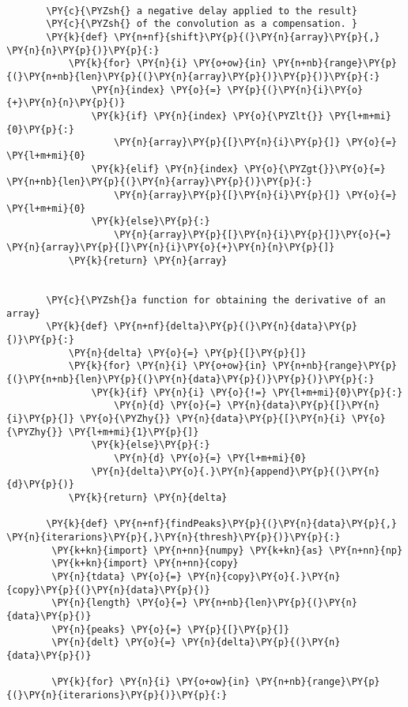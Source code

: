\begin{Verbatim}[commandchars=\\\{\}]
       
       \PY{c}{\PYZsh{} a negative delay applied to the result}
       \PY{c}{\PYZsh{} of the convolution as a compensation. }
       \PY{k}{def} \PY{n+nf}{shift}\PY{p}{(}\PY{n}{array}\PY{p}{,} \PY{n}{n}\PY{p}{)}\PY{p}{:}
           \PY{k}{for} \PY{n}{i} \PY{o+ow}{in} \PY{n+nb}{range}\PY{p}{(}\PY{n+nb}{len}\PY{p}{(}\PY{n}{array}\PY{p}{)}\PY{p}{)}\PY{p}{:}
               \PY{n}{index} \PY{o}{=} \PY{p}{(}\PY{n}{i}\PY{o}{+}\PY{n}{n}\PY{p}{)}
               \PY{k}{if} \PY{n}{index} \PY{o}{\PYZlt{}} \PY{l+m+mi}{0}\PY{p}{:}
                   \PY{n}{array}\PY{p}{[}\PY{n}{i}\PY{p}{]} \PY{o}{=} \PY{l+m+mi}{0}
               \PY{k}{elif} \PY{n}{index} \PY{o}{\PYZgt{}}\PY{o}{=} \PY{n+nb}{len}\PY{p}{(}\PY{n}{array}\PY{p}{)}\PY{p}{:}
                   \PY{n}{array}\PY{p}{[}\PY{n}{i}\PY{p}{]} \PY{o}{=} \PY{l+m+mi}{0}
               \PY{k}{else}\PY{p}{:}
                   \PY{n}{array}\PY{p}{[}\PY{n}{i}\PY{p}{]}\PY{o}{=} \PY{n}{array}\PY{p}{[}\PY{n}{i}\PY{o}{+}\PY{n}{n}\PY{p}{]}
           \PY{k}{return} \PY{n}{array}
       
       
       \PY{c}{\PYZsh{}a function for obtaining the derivative of an array}
       \PY{k}{def} \PY{n+nf}{delta}\PY{p}{(}\PY{n}{data}\PY{p}{)}\PY{p}{:}
           \PY{n}{delta} \PY{o}{=} \PY{p}{[}\PY{p}{]}
           \PY{k}{for} \PY{n}{i} \PY{o+ow}{in} \PY{n+nb}{range}\PY{p}{(}\PY{n+nb}{len}\PY{p}{(}\PY{n}{data}\PY{p}{)}\PY{p}{)}\PY{p}{:}
               \PY{k}{if} \PY{n}{i} \PY{o}{!=} \PY{l+m+mi}{0}\PY{p}{:}
                   \PY{n}{d} \PY{o}{=} \PY{n}{data}\PY{p}{[}\PY{n}{i}\PY{p}{]} \PY{o}{\PYZhy{}} \PY{n}{data}\PY{p}{[}\PY{n}{i} \PY{o}{\PYZhy{}} \PY{l+m+mi}{1}\PY{p}{]} 
               \PY{k}{else}\PY{p}{:} 
                   \PY{n}{d} \PY{o}{=} \PY{l+m+mi}{0}
               \PY{n}{delta}\PY{o}{.}\PY{n}{append}\PY{p}{(}\PY{n}{d}\PY{p}{)}
           \PY{k}{return} \PY{n}{delta}
       
       \PY{k}{def} \PY{n+nf}{findPeaks}\PY{p}{(}\PY{n}{data}\PY{p}{,} \PY{n}{iterarions}\PY{p}{,}\PY{n}{thresh}\PY{p}{)}\PY{p}{:}
       	\PY{k+kn}{import} \PY{n+nn}{numpy} \PY{k+kn}{as} \PY{n+nn}{np}
       	\PY{k+kn}{import} \PY{n+nn}{copy}
       	\PY{n}{tdata} \PY{o}{=} \PY{n}{copy}\PY{o}{.}\PY{n}{copy}\PY{p}{(}\PY{n}{data}\PY{p}{)}
       	\PY{n}{length} \PY{o}{=} \PY{n+nb}{len}\PY{p}{(}\PY{n}{data}\PY{p}{)}
       	\PY{n}{peaks} \PY{o}{=} \PY{p}{[}\PY{p}{]}
       	\PY{n}{delt} \PY{o}{=} \PY{n}{delta}\PY{p}{(}\PY{n}{data}\PY{p}{)}
       
       	\PY{k}{for} \PY{n}{i} \PY{o+ow}{in} \PY{n+nb}{range}\PY{p}{(}\PY{n}{iterarions}\PY{p}{)}\PY{p}{:}
       		

\end{Verbatim}
